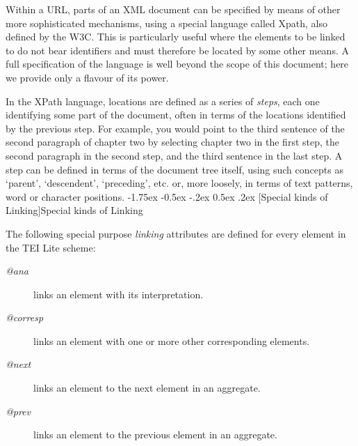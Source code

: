 \documentclass[11pt,twoside]{article}\makeatletter
\makeatletter
\renewcommand\section{\@startsection {section}{1}{\z@}%
     {-1.75ex \@plus -0.5ex \@minus -.2ex}%
     {0.5ex \@plus .2ex}%
     {\reset@font\Large\bfseries\sffamily}}
\renewcommand\subsection{\@startsection{subsection}{2}{\z@}%
     {-1.75ex\@plus -0.5ex \@minus- .2ex}%
     {0.5ex \@plus .2ex}%
     {\reset@font\Large\sffamily}}
\def\DivII{\subsection}
\def\DivII{\section}
\makeatother
\begin{document}
Within a URL, parts of an XML document can be specified by means of other more sophisticated mechanisms, using a special language called Xpath, also defined by the W3C.  This is particularly useful where the elements to be linked to do not bear identifiers and must therefore be located by some other means.  A full specification of the language is well beyond the scope of this document; here we provide only a flavour of its power. \par
In the XPath language, locations are defined as a series of \emph{steps}, each one identifying some part of the document, often in terms of the locations identified by the previous step.  For example, you would point to the third sentence of the second paragraph of chapter two by selecting chapter two in the first step, the second paragraph in the second step, and the third sentence in the last step. A step can be defined in terms of the document tree itself, using such concepts as ‘parent’, ‘descendent’, ‘preceding’, etc. or, more loosely, in terms of text patterns, word or character positions. 
\DivII[Special kinds of Linking]{Special kinds of Linking}\label{xatts}\par
The following special purpose \emph{linking} attributes are defined for every element in the TEI Lite scheme: \begin{description}

\item[\textit{@ana}]links an element with its interpretation.
\item[\textit{@corresp}]links an element with one or more other corresponding elements.
\item[\textit{@next}]links an element to the next element in an aggregate.
\item[\textit{@prev}]links an element to the previous element in an aggregate.
\end{description} \par
\end{document}
